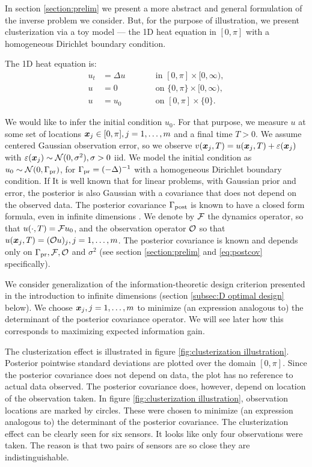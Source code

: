 In section \ref{section:prelim} we present a more abstract and general
formulation of the inverse problem we consider. But, for the purpose
of illustration, we present clusterization via a toy model --- the 1D
heat equation in $[0,\pi]$ with a homogeneous Dirichlet boundary
condition.

The 1D heat equation is:
\begin{subequations}\label{eq:heat equation}
  \begin{alignat}{2}
    u_t &= \Delta u &&\qquad \text{in } [0,\pi] \times [0,\infty),\\
      u &= 0 &&\qquad \text{on } \{0, \pi\} \times [0,\infty),\\
        u &= u_0 &&\qquad \text{on }[0,\pi] \times \{0\}.
  \end{alignat}
\end{subequations}

We would like to infer the initial condition $u_0$. For that purpose,
we measure $u$ at some set of locations ${\boldsymbol{x}}_j \in [0,\pi], j=1,
\dots,m$ and a final time $T > 0$. We assume centered Gaussian
observation error, so we observe $v({\boldsymbol{x}}_j,T) = u({\boldsymbol{x}}_j,T) + \varepsilon({\boldsymbol{x}}_j)$
with $\varepsilon({\boldsymbol{x}}_j) \sim \mathcal{N}(0, \sigma^2), \sigma > 0$ iid. We model
the initial condition as $u_0 \sim \mathcal{N}(0,\Gamma_{\textup{pr}})$, for $\Gamma_{\textup{pr}} =
(-\Delta)^{-1}$ with a homogeneous Dirichlet boundary condition. If It
is well known \cite{Tarantola05} that for linear problems, with
Gaussian prior and error, the posterior is also Gaussian with a
covariance that does not depend on the observed data. The posterior
covariance $\Gamma_{\textup{post}}$ is known to have a closed form formula, even in
infinite dimensions \cite{Stuart10}. We denote by $\mathcal{F}$ the dynamics
operator, so that $u( \cdot,T) = \mathcal{F} u_0$, and the observation
operator $\mathcal{O}$ so that $u({\boldsymbol{x}}_j,T) = (\mathcal{O} u)_j, j=1,\dots,m$. The
posterior covariance is known and depends only on $\Gamma_{\textup{pr}}, \mathcal{F}, \mathcal{O}$
and $\sigma^2$ (see section \ref{section:prelim} and
\eqref{eq:postcov} specifically).

We consider generalization of the information-theoretic design
criterion presented in the introduction to infinite dimensions
(section \ref{subsec:D optimal design} below). We choose
${\boldsymbol{x}}_j,j=1,\dots,m$ to minimize (an expression analogous to) the
determinant of the posterior covariance operator. We will see later
how this corresponds to maximizing expected information gain.

The clusterization effect is illustrated in figure
\ref{fig:clusterization illustration}. Posterior pointwise standard
deviations are plotted over the domain $[0, \pi]$. Since the posterior
covariance does not depend on data, the plot has no reference to
actual data observed. The posterior covariance does, however, depend
on location of the observation taken. In figure
\ref{fig:clusterization illustration}, observation locations are
marked by circles. These were chosen to minimize (an expression
analogous to) the determinant of the posterior covariance. The
clusterization effect can be clearly seen for six sensors. It looks
like only four observations were taken. The reason is that two pairs
of sensors are so close they are indistinguishable.



